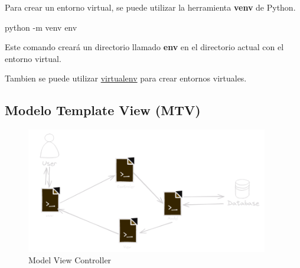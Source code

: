 \documentclass[
  a4paper,
  DIV=11,
  numbers=noendperiod,
  onepage,
  openany]{scrreprt}
\newenvironment{Shaded}{\begin{snugshade}}{\end{snugshade}}
\newcommand{\AttributeTok}[1]{\textcolor[rgb]{0.40,0.45,0.13}{#1}}
\newcommand{\ExtensionTok}[1]{\textcolor[rgb]{0.00,0.23,0.31}{#1}}
\newcommand{\NormalTok}[1]{\textcolor[rgb]{0.00,0.23,0.31}{#1}}
\begin{document}
Para crear un entorno virtual, se puede utilizar la herramienta
\textbf{venv} de Python.

\begin{Shaded}
\begin{Highlighting}[]
\ExtensionTok{python} \AttributeTok{{-}m}\NormalTok{ venv env}
\end{Highlighting}
\end{Shaded}

Este comando creará un directorio llamado \textbf{env} en el directorio
actual con el entorno virtual.

\begin{tcolorbox}[enhanced jigsaw, title=\textcolor{quarto-callout-tip-color}{\faLightbulb}\hspace{0.5em}{Tip}, colback=white, rightrule=.15mm, opacityback=0, colframe=quarto-callout-tip-color-frame, titlerule=0mm, opacitybacktitle=0.6, breakable, coltitle=black, colbacktitle=quarto-callout-tip-color!10!white, bottomtitle=1mm, toptitle=1mm, left=2mm, arc=.35mm, toprule=.15mm, leftrule=.75mm, bottomrule=.15mm]

Tambien se puede utilizar
\href{https://pypi.org/project/virtualenv/}{virtualenv} para crear
entornos virtuales.

\end{tcolorbox}

\subsection{Modelo Template View (MTV)}\label{modelo-template-view-mtv}

\begin{figure}[H]

{\centering \includegraphics[width=4.16667in,height=\textheight]{images/model-view-controller.png}

}

\caption{Model View Controller}

\end{figure}%
\end{document}
